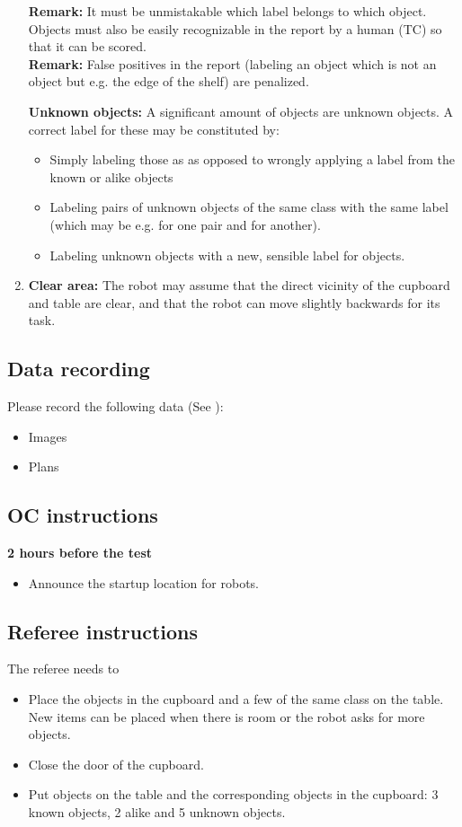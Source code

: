 \begin{enumerate}
		\textbf{Remark:} It must be unmistakable which label belongs to which object. Objects must also be easily recognizable in the report by a human (TC) so that it can be scored. \\

		\textbf{Remark:} False positives in the report (labeling an object which is not an object but e.g. the edge of the shelf) are penalized.

		\textbf{Unknown objects:} A significant amount of objects are unknown objects. A correct label for these may be constituted by: 
		\begin{itemize}
			\item Simply labeling those as  as opposed to wrongly applying a label from the known or alike objects
			\item Labeling pairs of unknown objects of the same class with the same label (which may be e.g.  for one pair and  for another). 
			\item Labeling unknown objects with a new, sensible label for objects.
	 	\end{itemize}

	\item \textbf{Clear area:} The robot may assume that the direct vicinity of the cupboard and table are clear, and that the robot can move slightly backwards for its task.
\end{enumerate}

\subsection{Data recording}
  Please record the following data (See ):
  \begin{itemize}
   \item Images
   \item Plans
  \end{itemize}

\subsection{OC instructions}

\textbf{2 hours before the test}
\begin{itemize}
    \item Announce the startup location for robots.
\end{itemize}

\subsection{Referee instructions}
The referee needs to
\begin{itemize}
\item Place the objects in the cupboard and a few of the same class on the table. New items can be placed when there is room or the robot asks for more objects. 
\item Close the door of the cupboard. 
\item Put objects on the table and the corresponding objects in the cupboard: 3 known objects, 2 alike and 5 unknown objects. 
\end{itemize}

